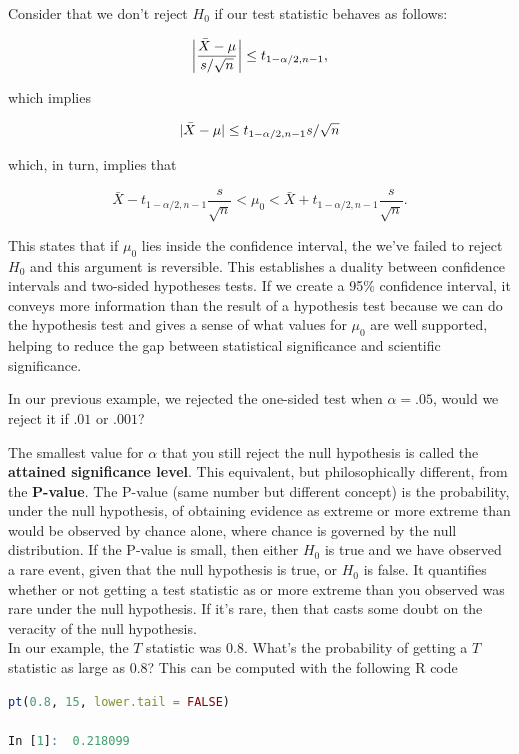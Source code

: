 \documentclass{homework}
\begin{document}
Consider that we don't reject $H_0$ if our test statistic behaves as follows:

$$
\bigg|\frac{\Bar{X}-\mu}{s/\sqrt{n}}\bigg| \leq t_{1-\alpha/2, n-1},
$$

which implies 

$$
|\Bar{X}-\mu| \leq t_{1-\alpha/2, n-1} s/\sqrt{n}
$$

which, in turn, implies that 

$$
\bar{X} - t_{1-\alpha/2, n-1} \frac{s}{\sqrt{n}} < \mu_0 < \bar{X} + t_{1-\alpha/2, n-1} \frac{s}{\sqrt{n}}.
$$

This states that if $\mu_0$ lies inside the confidence interval, the we've failed to reject $H_0$ and this argument is reversible. This establishes a duality between confidence intervals and two-sided hypotheses tests. If we create a 95\% confidence interval, it conveys more information than the result of a hypothesis test because we can do the hypothesis test and gives a sense of what values for $\mu_0$ are well supported, helping to reduce the gap between statistical significance and scientific significance. 

In our previous example, we rejected the one-sided test when $\alpha = .05$, would we reject it if $.01$ or $.001$?

The smallest value for $\alpha$ that you still reject the null hypothesis is called the \textbf{attained significance level}. This equivalent, but philosophically different, from the \textbf{P-value}.
The P-value (same number but different concept) is the probability, under the null hypothesis, of obtaining evidence as extreme or more extreme than would be observed by chance alone, where chance is governed by the null distribution. If the P-value is small, then either $H_0$ is true and we have observed a rare event, given that the null hypothesis is true, or $H_0$ is false. It quantifies whether or not getting a test statistic as or more extreme than you observed was rare under the null hypothesis. If it's rare, then that casts some doubt on the veracity of the null hypothesis. \\ 

In our example, the $T$ statistic was $0.8$. What's the probability of getting a $T$ statistic as large as $0.8$? This can be computed with the following R code 

\begin{lstlisting}[language=R]
pt(0.8, 15, lower.tail = FALSE) 

In [1]:  0.218099
\end{lstlisting}
\end{document}
